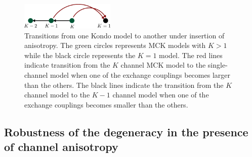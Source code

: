 \documentclass[reprint,prb,superscriptaddress]{revtex4-2}
\begin{document}
\begin{figure}[!htpb]
	\centering
	\includegraphics[width=0.4\textwidth]{./iqpt.pdf}
	\caption{Transitions from one Kondo model to another under insertion of anisotropy. The green circles represents MCK models with \(K>1\) while the black circle represents the \(K=1\) model. The red lines indicate transition from the \(K\) channel MCK model to the single-channel model when one of the exchange couplings becomes larger than the others. The black lines indicate the transition from the \(K\) channel model to the \(K-1\) channel model when one of the exchange couplings becomes smaller than the others.}
	\label{fig:-iqpt-pdf}
\end{figure}

\subsection{Robustness of the degeneracy in the presence of channel anisotropy}
\end{document}
